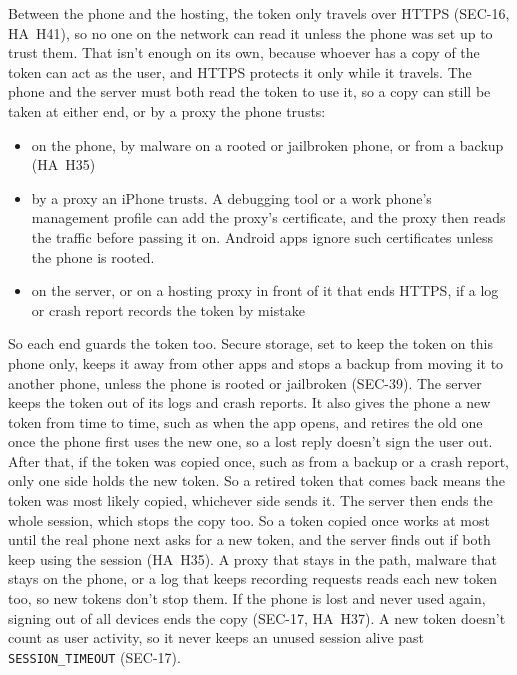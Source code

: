 \documentclass[12pt, titlepage]{article}
\begin{document}
\begin{description}
Between the phone and the hosting, the token only travels over HTTPS (\mbox{SEC-16}, HA~H41), so no one on the network can read it unless the phone was set up to trust them. That isn't enough on its own, because whoever has a copy of the token can act as the user, and HTTPS protects it only while it travels. The phone and the server must both read the token to use it, so a copy can still be taken at either end, or by a proxy the phone trusts:
\begin{itemize}
\item on the phone, by malware on a rooted or jailbroken phone, or from a backup (HA~H35)
\item by a proxy an iPhone trusts. A debugging tool or a work phone's management profile can add the proxy's certificate, and the proxy then reads the traffic before passing it on. Android apps ignore such certificates unless the phone is rooted.
\item on the server, or on a hosting proxy in front of it that ends HTTPS, if a log or crash report records the token by mistake
\end{itemize}
So each end guards the token too. Secure storage, set to keep the token on this phone only, keeps it away from other apps and stops a backup from moving it to another phone, unless the phone is rooted or jailbroken (\mbox{SEC-39}). The server keeps the token out of its logs and crash reports. It also gives the phone a new token from time to time, such as when the app opens, and retires the old one once the phone first uses the new one, so a lost reply doesn't sign the user out. After that, if the token was copied once, such as from a backup or a crash report, only one side holds the new token. So a retired token that comes back means the token was most likely copied, whichever side sends it. The server then ends the whole session, which stops the copy too. So a token copied once works at most until the real phone next asks for a new token, and the server finds out if both keep using the session (HA~H35). A proxy that stays in the path, malware that stays on the phone, or a log that keeps recording requests reads each new token too, so new tokens don't stop them. If the phone is lost and never used again, signing out of all devices ends the copy (\mbox{SEC-17}, HA~H37). A new token doesn't count as user activity, so it never keeps an unused session alive past \texttt{SESSION\_TIMEOUT} (\mbox{SEC-17}).


\end{description}
\end{document}
